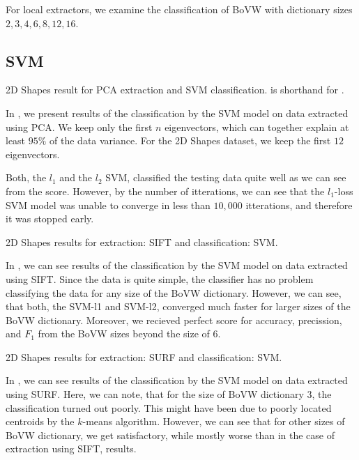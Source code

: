 For local extractors, we examine the classification of BoVW with dictionary sizes $2, 3, 4, 6, 8, 12, 16$.

\subsection{SVM}

\begin{table}[ht!]
    \centering
    
    \caption[2D Shapes result for PCA extraction and SVM classification]{2D Shapes result for PCA extraction and SVM classification.  is shorthand for .}
    \label{tab:2d_PCA_SVM}
\end{table}
In , we present results of the classification by the SVM model on data extracted using PCA. We keep only the first $n$ eigenvectors, which can together explain at least $95\%$ of the data variance. For the 2D Shapes dataset, we keep the first $12$ eigenvectors.

Both, the $l_1$ and the $l_2$ SVM, classified the testing data quite well as we can see from the score. However, by the number of itterations, we can see that the $l_1$-loss SVM model was unable to converge in less than $10,000$ itterations, and therefore it was stopped early.

\begin{table}[ht!]
    \centering
    
    \caption[2D Shapes results for extraction: SIFT and classification: SVM]{2D Shapes results for extraction: SIFT and classification: SVM.}
    \label{tab:2d_SIFT_SVM}
\end{table}
In , we can see results of the classification by the SVM model on data extracted using SIFT. Since the data is quite simple, the classifier has no problem classifying the data for any size of the BoVW dictionary. However, we can see, that both, the SVM-l1 and SVM-l2, converged much faster for larger sizes of the BoVW dictionary. Moreover, we recieved perfect score for accuracy, precission, and $F_1$ from the BoVW sizes beyond the size of $6$.

\begin{table}[ht!]
    \centering
    
    \caption[2D Shapes results for extraction: SURF and classification: SVM]{2D Shapes results for extraction: SURF and classification: SVM.}
    \label{tab:2d_SURF_SVM}
\end{table}
In , we can see results of the classification by the SVM model on data extracted using SURF. Here, we can note, that for the size of BoVW dictionary $3$, the classification turned out poorly. This might have been due to poorly located centroids by the $k$-means algorithm. However, we can see that for other sizes of BoVW dictionary, we get satisfactory, while mostly worse than in the case of extraction using SIFT, results.

